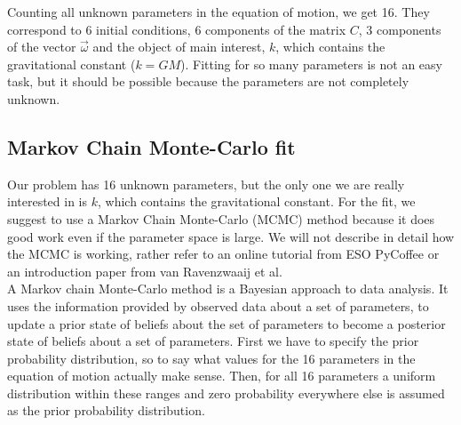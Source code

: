 \documentclass[prb,preprint]{revtex4-1}
\begin{document}
Counting all unknown parameters in the equation of motion, we get 16. They correspond to 6 initial conditions, 6 components of the matrix $C$, 3 components of the vector $\vec{\omega}$ and the object of main interest, $k$,  which contains the gravitational constant ($k = GM$). Fitting for so many parameters is not an easy task, but it should be possible because the parameters are not completely unknown.\\


\subsection{Markov Chain Monte-Carlo fit}

Our problem has 16 unknown parameters, but the only one we are really interested in is $k$, which contains the gravitational constant. For the fit, we suggest to use a Markov Chain Monte-Carlo (MCMC) method because it does good work even if the parameter space is large. We will not describe in detail how the MCMC is working, rather refer to an online tutorial from ESO PyCoffee\cite{esopycoffee} or an introduction paper from van Ravenzwaaij et al.\cite{vanRavenzwaaij16} \\

A Markov chain Monte-Carlo method is a Bayesian approach to data analysis. It uses the information provided by observed data about a set of parameters, to update a prior state of beliefs about the set of parameters to become a posterior state of beliefs about a set of parameters. First we have to specify the prior probability distribution, so to say what values for the 16 parameters in the equation of motion actually make sense. Then, for all 16 parameters a uniform distribution within these ranges and zero probability everywhere else is assumed as the prior probability distribution. \\
\end{document}

